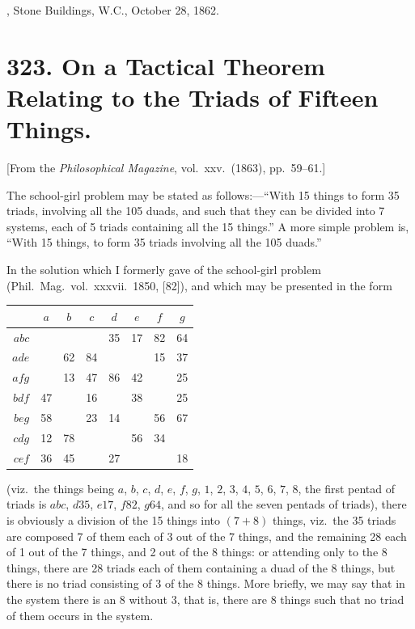 \documentclass[11pt,a4paper]{article}
\theoremstyle{plain}
\begin{document}
\medskip
{}, Stone Buildings, W.C., October 28, 1862.


\newpage
\section*{323. On a Tactical Theorem Relating to the Triads of Fifteen Things.}

[From the \textit{Philosophical Magazine}, vol.\ xxv.\ (1863), pp.\ 59--61.]

\medskip

The school-girl problem may be stated as follows:---``With 15 things to form 35 triads, involving all the 105 duads, and such that they can be divided into 7 systems, each of 5 triads containing all the 15 things.'' A more simple problem is, ``With 15 things, to form 35 triads involving all the 105 duads.''

In the solution which I formerly gave of the school-girl problem (Phil.\ Mag.\ vol.\ xxxvii.\ 1850, [82]), and which may be presented in the form
\begin{center}
\begin{tabular}{r|ccccccc}
        & $a$ & $b$ & $c$ & $d$ & $e$ & $f$ & $g$ \\ \hline
$abc$   &     &     &     & 35  & 17  & 82  & 64  \\
$ade$   &     & 62  & 84  &     &     & 15  & 37  \\
$afg$   &     & 13  & 47  & 86  & 42  &     & 25  \\
$bdf$   & 47  &     & 16  &     & 38  &     & 25  \\
$beg$   & 58  &     & 23  & 14  &     & 56  & 67  \\
$cdg$   & 12  & 78  &     &     & 56  & 34  &     \\
$cef$   & 36  & 45  &     & 27  &     &     & 18  \\
\end{tabular}
\end{center}
(viz.\ the things being $a$, $b$, $c$, $d$, $e$, $f$, $g$, $1$, $2$, $3$, $4$, $5$, $6$, $7$, $8$, the first pentad of triads is $abc$, $d35$, $e17$, $f82$, $g64$, and so for all the seven pentads of triads), there is obviously a division of the 15 things into $(7 + 8)$ things, viz.\ the 35 triads are composed 7 of them each of 3 out of the 7 things, and the remaining 28 each of 1 out of the 7 things, and 2 out of the 8 things: or attending only to the 8 things, there are 28 triads each of them containing a duad of the 8 things, but there is no triad consisting of 3 of the 8 things. More briefly, we may say that in the system there is an 8 without 3, that is, there are 8 things such that no triad of them occurs in the system.
\end{document}
